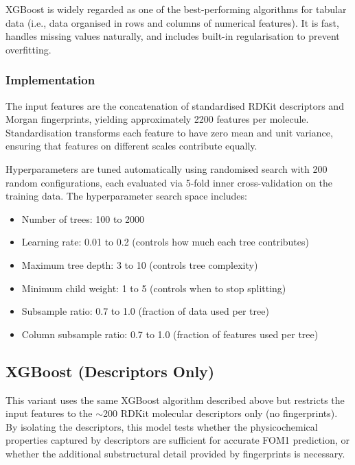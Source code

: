 \documentclass[11pt,a4paper]{article}
\begin{document}
XGBoost is widely regarded as one of the best-performing algorithms for tabular data (i.e., data organised in rows and columns of numerical features). It is fast, handles missing values naturally, and includes built-in regularisation to prevent overfitting.

\subsubsection*{Implementation}

The input features are the concatenation of standardised RDKit descriptors and Morgan fingerprints, yielding approximately 2200 features per molecule. Standardisation transforms each feature to have zero mean and unit variance, ensuring that features on different scales contribute equally.

Hyperparameters are tuned automatically using randomised search with 200 random configurations, each evaluated via 5-fold inner cross-validation on the training data. The hyperparameter search space includes:
\begin{itemize}
    \item Number of trees: 100 to 2000
    \item Learning rate: 0.01 to 0.2 (controls how much each tree contributes)
    \item Maximum tree depth: 3 to 10 (controls tree complexity)
    \item Minimum child weight: 1 to 5 (controls when to stop splitting)
    \item Subsample ratio: 0.7 to 1.0 (fraction of data used per tree)
    \item Column subsample ratio: 0.7 to 1.0 (fraction of features used per tree)
\end{itemize}

\subsection{XGBoost (Descriptors Only)}

This variant uses the same XGBoost algorithm described above but restricts the input features to the $\sim$200 RDKit molecular descriptors only (no fingerprints). By isolating the descriptors, this model tests whether the physicochemical properties captured by descriptors are sufficient for accurate FOM1 prediction, or whether the additional substructural detail provided by fingerprints is necessary.
\end{document}
